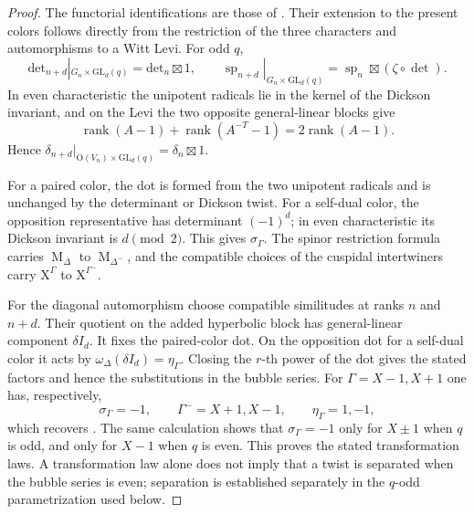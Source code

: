 \documentclass[12pt]{amsart}
\numberwithin{itemcounter}{subsection}
\theoremstyle{plain}
\theoremstyle{definition}
\theoremstyle{remark}
\numberwithin{equation}{section}
\def\O{\mathrm{O}}
\def\sp{{\operatorname{sp}\nolimits}}
\def\GL{\mathrm{GL}}
\def\M{{\operatorname{M}\nolimits}}
\begin{document}
\begin{proof}
The functorial identifications are those of \cite[\S3]{LSZ25}.  Their
extension to the present colors follows directly from the restriction of
the three characters and automorphisms to a Witt Levi.  For odd $q$,
\[
 \mathrm{det}_{n+d}|_{G_n\times\GL_d(q)}
   =\mathrm{det}_n\boxtimes1,
 \qquad
 \sp_{n+d}|_{G_n\times\GL_d(q)}
   =\sp_n\boxtimes(\zeta\circ\det).
\]
In even characteristic the unipotent radicals lie in the kernel of the
Dickson invariant, and on the Levi the two opposite general-linear blocks
give
\[
 \operatorname{rank}(A-1)+\operatorname{rank}(A^{-T}-1)
 =2\operatorname{rank}(A-1).
\]
Hence
$\delta_{n+d}|_{\O(V_n)\times\GL_d(q)}=\delta_n\boxtimes1$.

For a paired color, the dot is formed from the two unipotent radicals and is
unchanged by the determinant or Dickson twist.  For a self-dual color, the
opposition representative has determinant $(-1)^d$; in even characteristic
its Dickson invariant is $d\pmod2$.  This gives $\sigma_\Gamma$.  The
spinor restriction formula carries $\M_\Delta$ to $\M_{\Delta^-}$, and the
compatible choices of the cuspidal intertwiners carry $\mathrm{X}^\Gamma$ to
$\mathrm{X}^{\Gamma^-}$.

For the diagonal automorphism choose compatible similitudes at ranks $n$
and $n+d$.  Their quotient on the added hyperbolic block has general-linear
component $\delta I_d$.  It fixes the paired-color dot.  On the opposition
dot for a self-dual color it acts by
$\omega_\Delta(\delta I_d)=\eta_\Gamma$.  Closing the $r$-th power of the
dot gives the stated factors and hence the substitutions in the bubble
series.  For $\Gamma=X-1,X+1$ one has, respectively,
\[
 \sigma_\Gamma=-1,\qquad
 \Gamma^- =X+1,X-1,\qquad
 \eta_\Gamma=1,-1,
\]
which recovers \cite[Proposition~4.11]{LSZ25}.  The same calculation shows
that $\sigma_\Gamma=-1$ only for $X\pm1$ when $q$ is odd, and only for
$X-1$ when $q$ is even.  This proves the stated transformation laws.  A
transformation law alone does not imply that a twist is separated when the
bubble series is even; separation is established separately in the $q$-odd
parametrization used below.
\end{proof}
\end{document}
